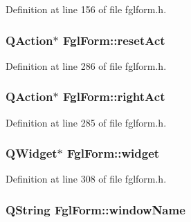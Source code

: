 Definition at line 156 of file fglform.h.

\hypertarget{classFglForm_aa9bb2c29fa0161164dd5250a7602a1be}{
\subsubsection[{resetAct}]{\setlength{\rightskip}{0pt plus 5cm}QAction$\ast$ {\bf FglForm::resetAct}}}
\label{classFglForm_aa9bb2c29fa0161164dd5250a7602a1be}


Definition at line 286 of file fglform.h.

\hypertarget{classFglForm_ac85748725f2a9ba437e62be1293eae02}{
\subsubsection[{rightAct}]{\setlength{\rightskip}{0pt plus 5cm}QAction$\ast$ {\bf FglForm::rightAct}}}
\label{classFglForm_ac85748725f2a9ba437e62be1293eae02}


Definition at line 285 of file fglform.h.

\hypertarget{classFglForm_a15cd139d56b40da6de43a6bb4d438c0d}{
\subsubsection[{widget}]{\setlength{\rightskip}{0pt plus 5cm}QWidget$\ast$ {\bf FglForm::widget}}}
\label{classFglForm_a15cd139d56b40da6de43a6bb4d438c0d}


Definition at line 308 of file fglform.h.

\hypertarget{classFglForm_a154084978ed81b8739db7197541881f5}{
\subsubsection[{windowName}]{\setlength{\rightskip}{0pt plus 5cm}QString {\bf FglForm::windowName}}}
\label{classFglForm_a154084978ed81b8739db7197541881f5}


